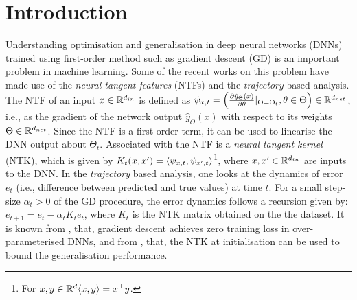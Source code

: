 \section{Introduction}
Understanding optimisation and generalisation in deep neural networks (DNNs) trained using first-order method such as gradient descent (GD) is an important problem in machine learning. Some of the recent works on this problem have made use of the \emph{neural tangent features} (NTFs) and the \emph{trajectory} based analysis. The NTF of an input $x\in \mathbb{R}^{d_{in}}$ is defined as $\psi_{x,t}=\left(\frac{\partial \hat{y}_{\Theta}(x)}{\partial \theta}|_{\Theta=\Theta_t},\theta \in \Theta\right)\in \mathbb{R}^{d_{net}}$, i.e., as the gradient of the network output $\hat{y}_{\Theta}(x)$ with respect to its weights $\Theta\in\mathbb{R}^{d_{net}}$. Since the NTF is a first-order term, it can be used to linearise the DNN output about $\Theta_t$. Associated with the NTF is a \emph{neural tangent kernel} (NTK), which is given by $K_t(x,x')=\langle \psi_{x,t},\psi_{x',t}\rangle$\footnote{For $x,y\in\mathbb{R}^d \langle x,y\rangle=x^\top y$.}, where $x,x'\in\mathbb{R}^{d_{in}}$ are inputs to the DNN. In the \emph{trajectory} based analysis, one looks at the dynamics of error $e_t$  (i.e., difference between predicted and true values) at time $t$. For a small step-size $\alpha_t>0$ of the GD procedure, the error dynamics follows a recursion given by: $e_{t+1}=e_t-\alpha_tK_te_t$, where $K_t$ is the NTK matrix obtained on the the dataset. It is known from \cite{dudnn}, that, gradient descent achieves zero training loss in over-parameterised DNNs, and from \cite{cao2019generalization}, that, the NTK at initialisation can be used to bound the generalisation performance.\\
\begin{comment}
 the following questions still remain unresolved \hfill\\
\textbf{Question I (Optimisation):} \emph{What is the role of width and depth in training of DNNs? Why increasing depth till a point helps in training? Why increasing the depth beyond hurts training?}\\
The results by \cite{dudnn} only throw light on why ResNets could be better than fully connected DNNs. The above question in relation to fully connected networks is still unresolved.\\
\textbf{Question II (Generalisation):} \emph{What are the hidden features in a DNN? Are these features learned? and if so, how?} \hfill\\
There are couple of unresolved issues in prior work by \cite{arora2019exact,cao2019generalization}. Firstly, if the DNNs are only linear learners with random NTFs, then it means that, no feature learning happens in DNNs. Secondly, it was observed in prior experiments, that, the DNNs perform better than their corresponding NTK counterparts \cite{arora2019exact,lee2019wide}. \hfill\\
\end{comment}
